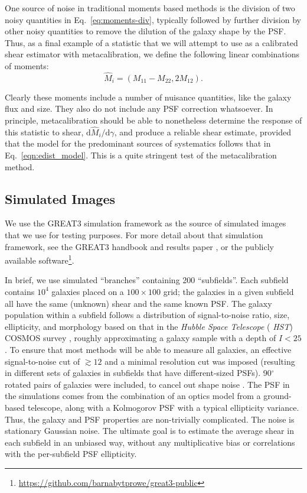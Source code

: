 \documentclass[iop]{emulateapj}
\begin{document}
One source of noise in traditional moments based methods is the
division of two noisy quantities in Eq.~\ref{eq:moments-div},
typically followed by further division by other noisy quantities to
remove the dilution of the galaxy shape by the PSF.  Thus, as a final
example of a statistic that we will attempt to use as a calibrated
shear estimator with metacalibration, we define the following linear
combinations of moments:
\begin{equation}
\hat{M}_i = (M_{11}-M_{22}, 2M_{12}).
\end{equation}

Clearly these moments include a number of nuisance quantities, like
the galaxy flux and size.  They also do not include any PSF correction
whatsoever.  In principle, metacalibration should be able to
nonetheless determine the response of this statistic to shear,
$\mathrm{d}\hat{M}_i/\mathrm{d}\gamma$, and produce a reliable shear
estimate, provided that the model for the predominant sources of
systematics follows that in Eq.~\ref{eqn:edist_model}.  This is a
quite stringent test of the metacalibration method.

\subsection{Simulated Images}

We use the GREAT3 simulation framework as the source of simulated
images that we use for testing purposes.  For more detail about that
simulation framework, see the GREAT3 handbook
\citep{2014ApJS..212....5M} and results paper
\citep{2015MNRAS.450.2963M}, or the publicly available
software\footnote{\url{https://github.com/barnabytprowe/great3-public}}.

In brief, we use simulated ``branches'' containing 200 ``subfields''.
Each subfield contains $10^4$ galaxies placed on a $100\times 100$
grid; the galaxies in a given subfield all have the same (unknown)
shear and the same known PSF.  The galaxy population within a subfield
follows a distribution of signal-to-noise ratio, size, ellipticity,
and morphology based on that in the {\it Hubble Space Telescope} ({\it
  HST}) COSMOS survey
\citep{2007ApJS..172..196K,2007ApJS..172....1S,2007ApJS..172...38S},
roughly approximating a galaxy sample with a depth of $I<25$.  To
ensure that most methods will be able to measure all galaxies, an
effective signal-to-noise cut of $\gtrsim 12$ and a minimal resolution
cut was imposed (resulting in different sets of galaxies in subfields
that have different-sized PSFs).  90$^\circ$ rotated pairs of galaxies
were included, to cancel out shape noise \citep{2007MNRAS.376...13M}.
The PSF in the simulations comes from the combination of an optics
model from a ground-based telescope, along with a Kolmogorov PSF with
a typical ellipticity variance.  Thus, the galaxy and PSF properties
are non-trivially complicated.  The noise is stationary Gaussian
noise.  The ultimate goal is to estimate the average shear in each
subfield in an unbiased way, without any multiplicative bias or
correlations with the per-subfield PSF ellipticity.
\end{document}
